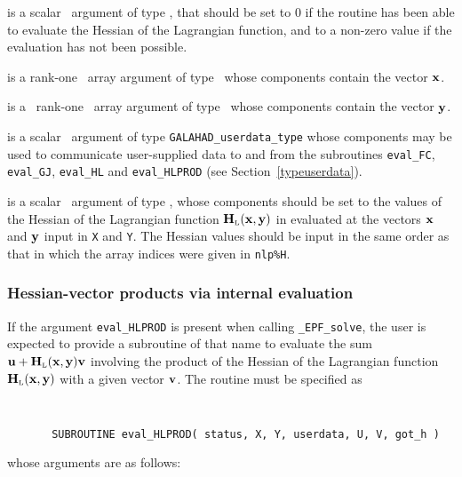 \documentclass{galahad}
\newcommand{\packagename}{EPF}
\newcommand{\fullpackagename}{\libraryname\_\packagename}
\newcommand{\solver}{{\tt \fullpackagename\_solve}}
\newcommand{\bmHL}{\bmH\sub{L}}
\begin{document}
\begin{description}
 is a scalar \intentout\ argument of type \integer,
that should be set to 0 if the routine has been able to evaluate
the Hessian of the Lagrangian function,
and to a non-zero value if the evaluation has not been possible.

 is a rank-one \intentin\ array argument of type \realdp\
whose components contain the vector ${\mathbf{x}}$.

 is a \ rank-one \intentin\ array argument of type
\realdp\ whose components contain the vector ${\mathbf{y}}$.

 is a scalar \intentinout\ argument of type
{\tt GALAHAD\_userdata\_type} whose components may be used
to communicate user-supplied data to and from the
subroutines {\tt eval\_FC}, {\tt eval\_GJ},
{\tt eval\_HL} and {\tt eval\_HLPROD}
(see Section~\ref{typeuserdata}).

 is a scalar \intentout\ argument of type \realdp,
whose components should be set to the values of the Hessian
of the Lagrangian function $\bmHL(\bmx,\bmy)$ in 
evaluated at the vectors ${\mathbf{x}}$ and ${\mathbf{y}}$  input in {\tt X} and {\tt Y}. 
The Hessian values should be input in the same order as that in which 
the array indices were given in {\tt nlp\%H}.

\end{description}


\subsubsection{Hessian-vector products via internal evaluation\label{hvfv}}

If the argument {\tt eval\_HLPROD} is present when calling \solver, the
user is expected to provide a subroutine of that name to evaluate the
sum $\bmu + \bmHL(\bmx,\bmy) \bmv$ involving the
product of the Hessian of the Lagrangian function $\bmHL(\bmx,\bmy)$
with a given vector ${\mathbf{v}}$. The routine must be specified as

\def\baselinestretch{0.8}
{\tt
\begin{verbatim}
       SUBROUTINE eval_HLPROD( status, X, Y, userdata, U, V, got_h )
\end{verbatim} }
\def\baselinestretch{1.0}
\noindent whose arguments are as follows:
\end{document}
